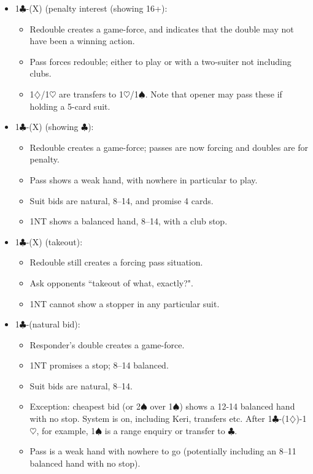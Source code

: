 \documentclass[a4paper,12pt]{article}
\begin{document}
\begin{itemize}
\item 1$\clubsuit$-(X) (penalty interest (showing 16+):
	\begin{itemize}
   \item Redouble creates a game-force, and indicates that the double may not have been 
      a winning action.
   \item Pass forces redouble; either to play or with a two-suiter not including clubs.
   \item 1$\diamondsuit$/1$\heartsuit$ are transfers to 1$\heartsuit$/1$\spadesuit$.  Note that opener may pass these if holding a 5-card 
      suit.
	\end{itemize}
\item 1$\clubsuit$-(X) (showing $\clubsuit$):
	\begin{itemize}
   \item Redouble creates a game-force; passes are now forcing and doubles are for penalty.
   \item Pass shows a weak hand, with nowhere in particular to play.
   \item Suit bids are natural, 8--14, and promise 4 cards.
   \item 1NT shows a balanced hand, 8--14, with a club stop.
	\end{itemize}
\item 1$\clubsuit$-(X) (takeout):
	\begin{itemize}
   \item Redouble still creates a forcing pass situation.
   \item Ask opponents ``takeout of what, exactly?".
   \item 1NT cannot show a stopper in any particular suit.
	\end{itemize}
\item 1$\clubsuit$-(natural bid):
	\begin{itemize}
   \item Responder's double creates a game-force.
   \item 1NT promises a stop; 8--14 balanced.
   \item Suit bids are natural, 8--14.
   \item Exception: cheapest bid (or 2$\spadesuit$ over 1$\spadesuit$) shows a 12-14 balanced hand with no stop.  System is on, including Keri, transfers etc.  After 1$\clubsuit$-(1$\diamondsuit$)-1$\heartsuit$, for example, 1$\spadesuit$ is a range enquiry or transfer to $\clubsuit$.
   \item Pass is a weak hand with nowhere to go (potentially including an 8--11 balanced hand with no stop).
	\end{itemize}
\end{itemize}
\end{document}
